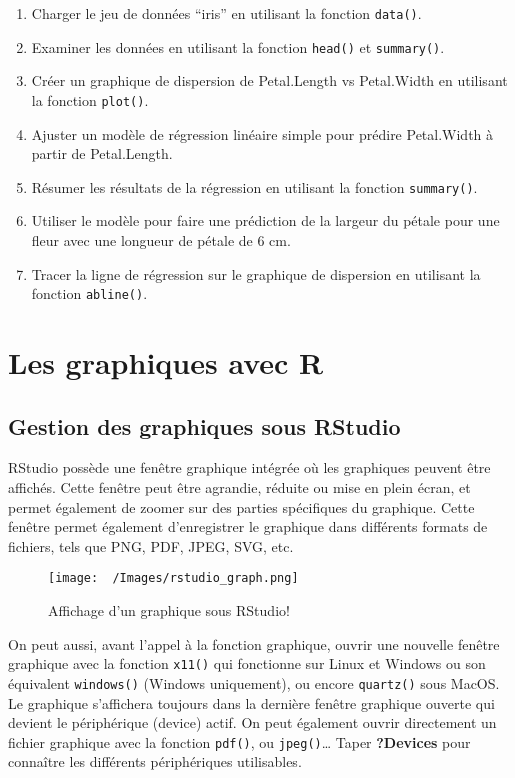 \documentclass[
]{article}
\providecommand{\tightlist}{%
  \setlength{\itemsep}{0pt}\setlength{\parskip}{0pt}}
\begin{document}
\begin{enumerate}
\def\labelenumi{\arabic{enumi}.}
\tightlist
\item
  Charger le jeu de données ``iris'' en utilisant la fonction \texttt{data()}.
\item
  Examiner les données en utilisant la fonction \texttt{head()} et \texttt{summary()}.
\item
  Créer un graphique de dispersion de Petal.Length vs Petal.Width en utilisant la fonction \texttt{plot()}.
\item
  Ajuster un modèle de régression linéaire simple pour prédire Petal.Width à partir de Petal.Length.
\item
  Résumer les résultats de la régression en utilisant la fonction \texttt{summary()}.
\item
  Utiliser le modèle pour faire une prédiction de la largeur du pétale pour une fleur avec une longueur de pétale de 6 cm.
\item
  Tracer la ligne de régression sur le graphique de dispersion en utilisant la fonction \texttt{abline()}.
\end{enumerate}

\hypertarget{les-graphiques-avec-r}{%
\section{Les graphiques avec R}\label{les-graphiques-avec-r}}

\hypertarget{gestion-des-graphiques-sous-rstudio}{%
\subsection{Gestion des graphiques sous RStudio}\label{gestion-des-graphiques-sous-rstudio}}

RStudio possède une fenêtre graphique intégrée où les graphiques peuvent être affichés. Cette fenêtre peut être agrandie, réduite ou mise en plein écran, et permet également de zoomer sur des parties spécifiques du graphique. Cette fenêtre permet également d'enregistrer le graphique dans différents formats de fichiers, tels que PNG, PDF, JPEG, SVG, etc.

\begin{figure}
\centering
\texttt{[image: ~/Images/rstudio\_graph.png]}
\caption{Affichage d'un graphique sous RStudio!}
\end{figure}

On peut aussi, avant l'appel à la fonction graphique, ouvrir une nouvelle fenêtre graphique avec la fonction \texttt{x11()} qui fonctionne sur Linux et Windows ou son équivalent \texttt{windows()} (Windows uniquement), ou encore \texttt{quartz()} sous MacOS. Le graphique s'affichera toujours dans la dernière fenêtre graphique ouverte qui devient le périphérique (device) actif.
On peut également ouvrir directement un fichier graphique avec la fonction \texttt{pdf()}, ou \texttt{jpeg()}\ldots{} Taper \textbf{?Devices} pour connaître les différents périphériques utilisables.
\end{document}
